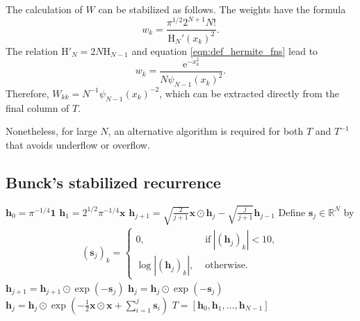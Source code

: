 \documentclass[10pt]{article}
\numberwithin{theorem}{section}
\begin{document}
The calculation of $W$ can be stabilized as follows. The weights have the formula \cite[(15.3.6)]{szego1939orthogonal}
\begin{equation}
    w_k = \frac{\pi^{1/2}2^{N+1}N!}{\mathrm{H}_{N}'(x_k)^2}.
\end{equation}
The relation $\mathrm{H}'_N = 2N \mathrm{H}_{N{-}1}$ \cite[(18.9.25)]{NIST:DLMF} and equation \eqref{eqn:def_hermite_fns} lead to
\begin{equation}\label{eqn:ghweights}
    w_k = \frac{\mathrm{e}^{-x_k^2}}{N \psi_{N{-}1}(x_k)^2}.
\end{equation}
Therefore, $W_{kk} = N^{-1}\psi_{N{-}1}(x_k)^{-2}$, which can be extracted directly from the final column of $T$.

Nonetheless, for large $N$, an alternative algorithm is required for both $T$ and $T^{-1}$ that avoids underflow or overflow.

\subsection{Bunck's stabilized recurrence}\label{sec:Bunck_method}

\begin{algorithm}[h!]\caption{Bunck's stabilized recurrence for building $T$ \\ \textbf{Input:} Gauss--Hermite nodes $\mathbf{x} \in \mathbb{R}^{N}$ \\ \textbf{Output:}  $T\in\mathbb{R}^{N\times N}$ in equation \eqref{eqn:T}.}\label{alg:HermiteTransformPlan}
\begin{algorithmic}[1]
\State $\mathbf{h}_0 = \pi^{-1/4} \mathbf{1}$
\State $\mathbf{h}_1=2^{1/2}\pi^{-1/4} \mathbf{x}$
\State $\mathbf{h}_{j+1} = \sqrt{\tfrac{2}{j+1}} \mathbf{x} \odot \mathbf{h}_{j} - \sqrt{\tfrac{j}{j+1}} \mathbf{h}_{j-1}$
\State Define $\mathbf{s}_j \in \mathbb{R}^{N}$ by \begin{align*}
		(\mathbf{s}_{j})_k=\begin{cases}
			0,&\text{ if}\ \left|\left(\mathbf{h}_{j}\right)_k\right|< 10,\\
			\log\left|\left(\mathbf{h}_{j}\right)_k\right| ,& \text{ otherwise.}
		\end{cases}
	\end{align*}
    \State $\mathbf{h}_{j+1} = \mathbf{h}_{j+1} \odot \exp(-\mathbf{s}_j)$
    \State $\mathbf{h}_j = \mathbf{h}_j \odot \exp(-\mathbf{s}_j)$
\EndFor
{}
\State $\mathbf{h}_j = \mathbf{h}_j \odot \exp\left(-\frac{1}{2} \mathbf{x} \odot \mathbf{x}+\sum_{i=1}^j \mathbf{s}_i \right)$
\EndFor
\State $T = [\mathbf{h}_0, \mathbf{h}_1,\ldots,\mathbf{h}_{N{-}1}] $
\end{algorithmic}
\end{algorithm}
\end{document}
